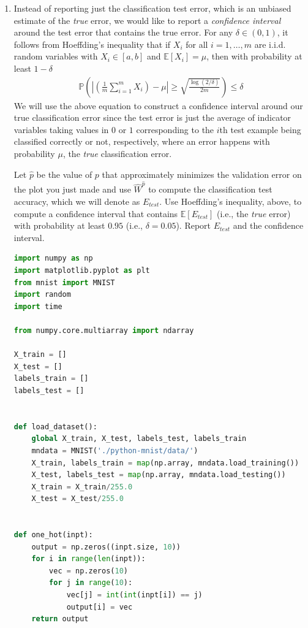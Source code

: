 \documentclass{article}
\newcommand{\1}{\mathbf{1}}
\renewcommand{\P}{\mathbb{P}} %
\def\E{\mathbb{E}}
\def\P{\mathbb{P}}
\begin{document}
\begin{enumerate}
\item Instead of reporting just the classification test error, which is an unbiased estimate of the \emph{true} error, we would like to report a \emph{confidence interval} around the test error that contains the true error.
For any $\delta \in (0,1)$, it follows from Hoeffding's inequality that if $X_i$ for all $i=1,\dots,m$ are i.i.d. random variables with $X_i \in [a,b]$ and $\E[X_i] = \mu$, then with probability at least $1-\delta$ 
\begin{align*}
\P\left( \left| \left(\frac{1}{m} \sum_{i=1}^m X_i\right) - \mu \right| \geq \sqrt{\frac{\log(2/\delta)}{2m}} \right) \leq \delta
\end{align*}
We will use the above equation to construct a confidence interval around our true classification error since the test error is just the average of indicator variables taking values in $0$ or $1$ corresponding to the $i$th test example being classified correctly or not, respectively, where an error happens with probability $\mu$, the \emph{true} classification error. 

Let $\widehat{p}$ be the value of $p$ that approximately minimizes the validation error on the plot you just made and use $\widehat{W}^{\widehat{p}}$ to compute the classification test accuracy, which we will denote as $E_{test}$. 
Use Hoeffding's inequality, above, to compute a confidence interval that contains $\E[E_{test}]$ (i.e., the \emph{true} error) with probability at least $0.95$ (i.e., $\delta=0.05$).
Report $E_{test}$ and the confidence interval. 
\begin{lstlisting}[language=Python]
import numpy as np
import matplotlib.pyplot as plt
from mnist import MNIST
import random
import time

from numpy.core.multiarray import ndarray

X_train = []
X_test = []
labels_train = []
labels_test = []


def load_dataset():
    global X_train, X_test, labels_test, labels_train
    mndata = MNIST('./python-mnist/data/')
    X_train, labels_train = map(np.array, mndata.load_training())
    X_test, labels_test = map(np.array, mndata.load_testing())
    X_train = X_train/255.0
    X_test = X_test/255.0


def one_hot(inpt):
    output = np.zeros((inpt.size, 10))
    for i in range(len(inpt)):
        vec = np.zeros(10)
        for j in range(10):
            vec[j] = int(int(inpt[i]) == j)
            output[i] = vec
    return output



\end{lstlisting}
\end{enumerate}
\end{document}
